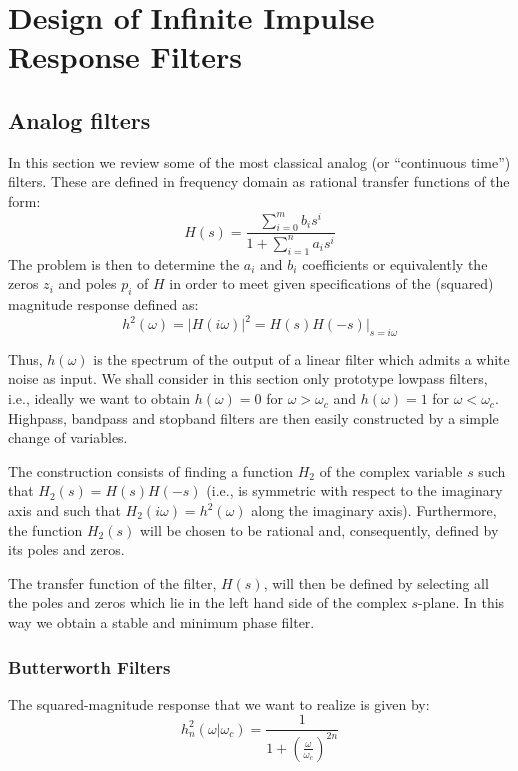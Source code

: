 
\chapter[IIR Filters]{Design of Infinite Impulse Response Filters}
\label{iir}

\section{Analog filters}
In this section we review some of the most classical analog (or ``continuous time'') filters.
These are defined in frequency domain as rational transfer functions of the form:
$$H(s)=\displaystyle{ \frac{\sum_{i=0}^{m}{b_i s ^i}}{1+\sum_{i=1}^{n}{a_i s ^i}}}$$
The problem is then to determine the $a_i$ and $b_i$ coefficients or equivalently the zeros $z_i$ and poles $p_i$ of $H$ in order to meet given specifications of the (squared) magnitude response defined as: 
\begin{equation}
\label{hhh}
h^2(\omega)={\vert H(i\omega) \vert}^2={H(s)H(-s) \vert _{s=i\omega}}
\end{equation}

Thus, $h(\omega)$ is the spectrum of the output of a linear filter which admits a white noise as input.
We shall consider in this section only prototype lowpass filters, i.e., ideally we want to obtain $h(\omega) = 0$ for $\omega > \omega_c$ and $h(\omega) = 1$ for $\omega < \omega_c$.
Highpass, bandpass and stopband filters are then easily constructed by a simple change of variables.

The construction consists of finding a function $H_2$ of the complex variable $s$ such that $H_2(s) = H(s)H(-s)$ (i.e., 
is symmetric with respect to the imaginary axis and 
such that $H_2(i \omega) = h^2(\omega)$ along the imaginary axis).
Furthermore, the function $H_2(s)$ will be chosen to be rational and, 
consequently,  defined by its poles and zeros.

The transfer function of the filter, $H(s)$,  will then be 
defined by selecting all the poles and zeros which lie in the left hand
side of the complex $s$-plane.
In this way we obtain a stable and minimum phase filter.

\subsection{Butterworth Filters}
The squared-magnitude response that we want to realize is given by:
\begin{equation}
\label{real}
h_n^2(\omega \vert \omega_c)=\displaystyle{\frac{1}{1+\displaystyle{{(\frac{\omega}{ \omega_c})}^{2n}}}}
\end{equation}

